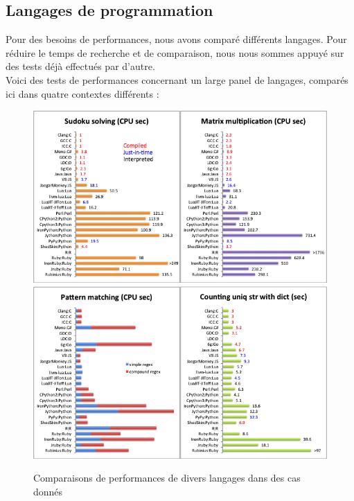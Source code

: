 \documentclass[a4paper]{article}
\newcommand{\alinea}{\hspace*{0.5cm}}
\begin{document}
      \subsection{Langages de programmation}
        \alinea Pour des besoins de performances, nous avons comparé différents langages. Pour réduire le temps de recherche et de comparaison, nous nous sommes appuyé sur des tests déjà effectués par d'autre.\\
        \alinea Voici des tests de performances concernant un large panel de langages, comparés ici dans quatre contextes différents :\\
        \begin{figure}
          \begin{center}
            \includegraphics[scale=0.5]{AnalyseLangage1.png}
            \includegraphics[scale=0.5]{AnalyseLangage2.png} 
          \end{center}
          \label{DiagAnalyse}
          \caption{Comparaisons de performances de divers langages dans des cas donnés}
        \end{figure}
\end{document}
